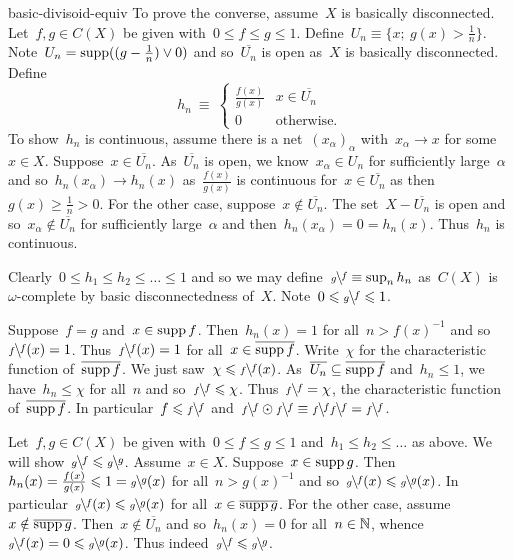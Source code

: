 \begin{solution}{basic-divisoid-equiv}
To prove the converse, assume~$X$ is basically disconnected.
Let~$f,g \in C(X)$ be given with~$0 \leq f \leq g \leq 1$.
    Define~$U_n \equiv \{x; \ g(x) > \frac{1}{n}\}$.
Note~$U_n = \operatorname{supp} ((g - \frac{1}{n}) \vee 0)$
    and so~$\overline{U_n}$ is open as~$X$ is basically disconnected.
Define
\begin{equation*}
    h_n \ \equiv \  \begin{cases}
        \frac{f(x)}{g(x)} & x \in \overline{U_n}\\
        0 & \text{otherwise}.
    \end{cases}
\end{equation*}
To show~$h_n$ is continuous, assume
    there is a net~$(x_\alpha)_\alpha$ with~$x_\alpha \to x$
        for some~$x \in X$.
    Suppose~$x \in \overline{U_n}$.
    As~$\overline{U_n}$ is open,
        we know~$x_\alpha \in U_n$
        for sufficiently large~$\alpha$
        and so~$h_n(x_\alpha) \to h_n(x)$
            as~$\frac{f(x)}{g(x)}$
            is continuous for~$x \in \overline{U_n}$
                as then~$g(x) \geq \frac{1}{n} > 0$.
    For the other case, suppose~$x \notin\overline{ U_n}$.
The set~$X - \overline{U_n}$ is open
    and so~$x_\alpha \notin \overline{U_n}$ for sufficiently large~$\alpha$
        and then~$h_n(x_\alpha)=0 = h_n(x)$.
    Thus~$h_n$ is continuous.

Clearly~$0\leq h_1 \leq h_2 \leq \ldots \leq 1$
 and so we may define~$\rfrac{f}{g} \equiv \sup_n h_n$
 as~$C(X)$ is~$\omega$-complete by basic disconnectedness of~$X$.
 Note~$0 \leq \rfrac{f}{g} \leq 1$.

Suppose~$f=g$ and~$x \in \operatorname{supp} f$.
Then~$h_n(x) = 1$ for all~$n > f(x)^{-1}$
    and so~$\rfrac{f}{f}(x) = 1$.
Thus~$\rfrac{f}{f}(x) = 1$ for all~$x \in \overline{\operatorname{supp} f}$.
Write~$\chi$ for the characteristic function of~$\overline{\operatorname{supp} f}$.
We just saw~$\chi \leq \rfrac{f}{f}(x)$.
As~$\overline{U_n} \subseteq \overline{\operatorname{supp} f}$ and~$h_n \leq 1$,
    we have~$h_n \leq \chi$ for all~$n$ and
    so~$\rfrac{f}{f} \leq \chi$. Thus~$\rfrac{f}{f} = \chi$,
    the characteristic function of~$\overline{\operatorname{supp} f}$.
In particular~$f \leq \rfrac{f}{f}$
    and~$\rfrac{f}{f} \odot \rfrac{f}{f}
        \equiv \rfrac{f}{f}\rfrac{f}{f} = \rfrac{f}{f}$.

Let~$f,g \in C(X)$ be given with~$0 \leq f\leq g \leq 1$
    and~$h_1 \leq h_2\leq  \ldots$ as above.
We will show~$\rfrac{f}{g} \leq \rfrac{g}{g}$.
Assume~$x \in X$.
Suppose~$x \in \operatorname{supp} g$.
Then~$h_n(x) = \frac{f(x)}{g(x)} \leq 1 = \rfrac{g}{g}(x)$
    for all~$n > g(x)^{-1}$
    and so~$\rfrac{f}{g}(x) \leq \rfrac{g}{g}(x)$.
In particular~$\rfrac{f}{g}(x) \leq \rfrac{g}{g}(x)$
    for all~$x \in \overline{\operatorname{supp} g}$.
For the other case, assume~$x \notin \overline{\operatorname{supp} g}$.
Then~$x \notin \overline{U_n}$ and
    so~$h_n(x) = 0$ for all~$n \in \mathbb{N}$,
    whence~$\rfrac{f}{g}(x) = 0 \leq \rfrac{g}{g}(x)$.
Thus indeed~$\rfrac{f}{g} \leq \rfrac{g}{g}$.


\end{solution}
